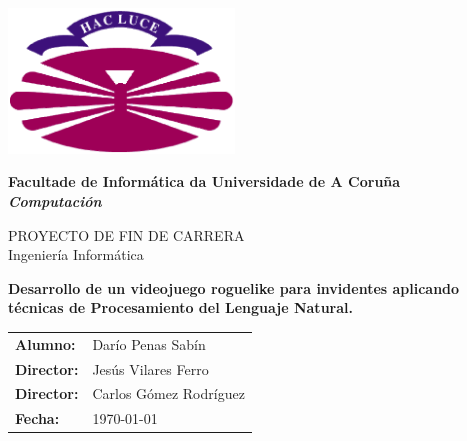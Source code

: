 %
%

%

\begin{titlepage}

	\begin{center}

		\includegraphics[width=6cm]{./eps/logo_udc-eps-converted-to.pdf}
		\vspace{2cm}

		{\Large{\textbf{Facultade de Informática da Universidade de A Coruña}}}
		\\
		{\it \large{\textbf{Computación}}}
		\vspace{1cm}

		{\large PROYECTO DE FIN DE CARRERA\\Ingeniería Informática}
		\vspace{1cm}

		\textbf{\Large Desarrollo de un videojuego roguelike para invidentes aplicando técnicas de Procesamiento del Lenguaje Natural.}
		\vspace{7cm}
	\end{center}

	\begin{flushright}
		\begin{tabular}{ll}
			\large{\textbf{Alumno:}}	&
			\large{Darío Penas Sabín} \\

			\large{\textbf{Director:}}	&
			\large{Jesús Vilares Ferro} \\

			\large{\textbf{Director:}}	&
			\large{Carlos Gómez Rodríguez} \\

			\large{\textbf{Fecha:}}	&
			\large{\today} \\
		\end{tabular}
	\end{flushright}

\end{titlepage}
